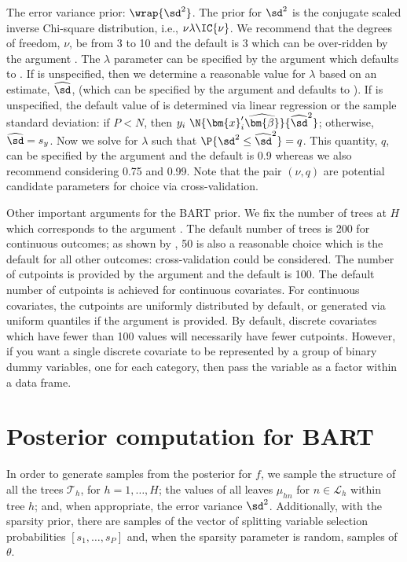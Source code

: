 \documentclass[article]{jss}
\begin{document}
The error variance prior: $\wrap{\sd^2}$. The prior for $\sd^2$ is the
conjugate scaled inverse Chi-square distribution, i.e.,
$\nu \lambda \IC{\nu}$.  We recommend that the degrees of freedom,
$\nu$, be from 3 to 10 and the default is 3 which can be over-ridden
by the argument .  The $\lambda$ parameter can be specified by
the  argument which defaults to .  If
 is unspecified, then we determine a reasonable value for
$\lambda$ based on an estimate, $\widehat\sd$, (which can be specified by
the argument  and defaults to ).  If
 is unspecified, the default value of  is
determined via linear regression or the sample standard deviation: if
$P<N$, then $y_i ~\N{\bm{x}_i'\widehat{\bm{\beta}}}{\widehat{\sd}^2}$;
otherwise, $\widehat{\sd}=s_y$.  Now we solve for $\lambda$ such that
$\P{\sd^2\le \widehat{\sd}^2}=q$.  This quantity, $q$, can be specified by
the argument  and the default is 0.9 whereas we also
recommend considering 0.75 and 0.99.  Note that the pair $(\nu, q)$
are potential candidate parameters for choice via cross-validation.

Other important arguments for the BART prior.  We fix the number of
trees at $H$ which corresponds to the argument .  The
default number of trees is 200 for continuous outcomes; as shown by
\citet{BleiKape14}, 50 is also a reasonable choice which is the
default for all other outcomes: cross-validation could be considered.
The number of cutpoints is provided by the argument  and
the default is 100.  The default number of cutpoints is achieved for
continuous covariates.  For continuous covariates, the cutpoints are
uniformly distributed by default, or generated via uniform quantiles
if the argument  is provided.  By default,
discrete covariates which have fewer than 100 values will necessarily
have fewer cutpoints.  However, if you want a single discrete
covariate to be represented by a group of binary dummy variables, one
for each category, then pass the variable as a factor within a data
frame.

\section{Posterior computation for BART}\label{post}

In order to generate samples from the posterior for $f$, we sample the
structure of all the trees $\mathcal{T}_h$, for $h=1,\dots,H$; the
values of all leaves $\mu_{hn}$ for $n \in \mathcal{L}_h$
within tree $h$; and, when appropriate, the error variance $\sd^2$.
Additionally, with the sparsity prior, there are samples of the vector
of splitting variable selection probabilities $[s_1,\dots,s_P]$ and,
when the sparsity parameter is random, samples of $\theta$.
\end{document}
